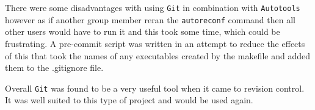 There were some disadvantages with using \texttt{Git} in combination with \texttt{Autotools} however as if another group member reran the \texttt{autoreconf} command then all other users would have to run it and this took some time, which could be frustrating.
A pre-commit script was written in an attempt to reduce the effects of this that took the names of any executables created by the makefile and added them to the .gitignore file.

Overall \texttt{Git} was found to be a very useful tool when it came to revision control.
It was well suited to this type of project and would be used again.
